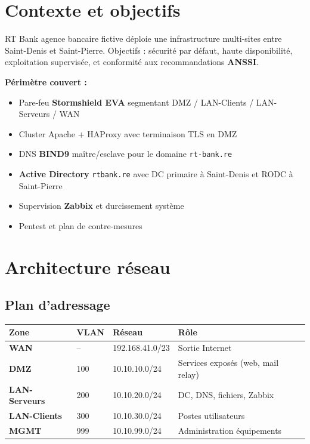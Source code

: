 \documentclass[11pt,a4paper]{article}
\begin{document}
\setcounter{page}{1}

{\sffamily
\hypersetup{linkcolor=primary}
\renewcommand{\contentsname}{\textcolor{accent}{\faList~} Sommaire}
\tableofcontents
}
\vspace{0.4cm}

\section{Contexte et objectifs}

\begin{infobox}[title={\faBullseye~Mission}]
RT Bank \textemdash{} agence bancaire fictive \textemdash{} déploie une infrastructure multi-sites entre Saint-Denis et Saint-Pierre. Objectifs : sécurité par défaut, haute disponibilité, exploitation supervisée, et conformité aux recommandations \textbf{ANSSI}.
\end{infobox}

\textbf{Périmètre couvert :}
\begin{itemize}
  \item Pare-feu \textbf{Stormshield EVA} segmentant DMZ / LAN-Clients / LAN-Serveurs / WAN
  \item Cluster Apache + HAProxy avec terminaison TLS en DMZ
  \item DNS \textbf{BIND9} maître/esclave pour le domaine \texttt{rt-bank.re}
  \item \textbf{Active Directory} \texttt{rtbank.re} avec DC primaire à Saint-Denis et RODC à Saint-Pierre
  \item Supervision \textbf{Zabbix} et durcissement système
  \item Pentest et plan de contre-mesures
\end{itemize}

\section{Architecture réseau}

\subsection{Plan d'adressage}

\renewcommand{\arraystretch}{1.3}
\begin{tabularx}{\linewidth}{@{}>{\bfseries}l l l X@{}}
\toprule
\rowcolor{light} Zone & VLAN & Réseau & Rôle \\ \midrule
WAN           & --  & 192.168.41.0/23 & Sortie Internet \\
DMZ           & 100 & 10.10.10.0/24   & Services exposés (web, mail relay) \\
LAN-Serveurs  & 200 & 10.10.20.0/24   & DC, DNS, fichiers, Zabbix \\
LAN-Clients   & 300 & 10.10.30.0/24   & Postes utilisateurs \\
MGMT          & 999 & 10.10.99.0/24   & Administration équipements \\
\bottomrule
\end{tabularx}
\end{document}
